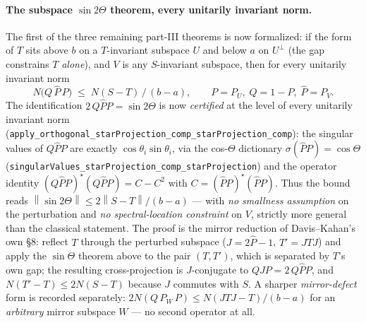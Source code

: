 \documentclass[11pt]{article}
\newcommand{\norm}[1]{\left\lVert #1\right\rVert}
\theoremstyle{remark}
\begin{document}
\paragraph{The subspace $\sin2\Theta$ theorem, every unitarily invariant norm.}
The first of the three remaining part-III theorems is now formalized: if the
form of $T$ sits above $b$ on a $T$-invariant subspace $U$ and below $a$ on
$U^{\perp}$ (the gap constrains $T$ \emph{alone}), and $V$ is any
$S$-invariant subspace, then for every unitarily invariant norm
\[
  N\bigl(Q\,\widehat P\,P\bigr)\;\le\;N(S-T)\,/\,(b-a),
  \qquad P=P_U,\; Q=1-P,\; \widehat P=P_V .
\]
The identification $2\,Q\widehat P P=\sin2\Theta$ is now \emph{certified} at
the level of every unitarily invariant norm
(\texttt{apply\_orthogonal\_starProjection\_comp\_starProjection\_comp}): the
singular values of $Q\widehat P P$ are exactly $\cos\theta_i\sin\theta_i$, via
the cos-$\Theta$ dictionary $\sigma(\widehat P P)=\cos\Theta$
(\texttt{singularValues\_starProjection\_comp\_starProjection}) and the
operator identity $(Q\widehat PP)^\star(Q\widehat PP)=C-C^2$ with
$C=(\widehat PP)^\star(\widehat PP)$.  Thus the bound reads
$\norm{\sin2\Theta}\le 2\norm{S-T}/(b-a)$ --- with \emph{no smallness
assumption} on the perturbation and \emph{no spectral-location constraint} on
$V$, strictly more general than the classical statement.  The proof is the
mirror reduction of Davis--Kahan's own \S8: reflect $T$ through the perturbed
subspace ($J=2\widehat P-1$, $T'=JTJ$) and apply the $\sin\Theta$ theorem
above to the pair $(T,T')$, which is separated by $T$'s own gap; the resulting
cross-projection is $J$-conjugate to $Q J P=2\,Q\widehat P P$, and
$N(T'-T)\le 2N(S-T)$ because $J$ commutes with $S$.  A sharper
\emph{mirror-defect} form is recorded separately:
$2N(Q\,P_W\,P)\le N(JTJ-T)/(b-a)$ for an \emph{arbitrary} mirror subspace
$W$ --- no second operator at all.
\end{document}

